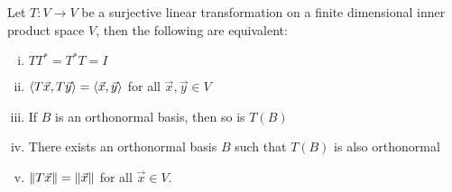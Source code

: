 \begin{theorem}
  Let $T : V \to V$ be a surjective linear transformation on a finite dimensional inner product space $V$, then the following are equivalent:
  \begin{enumerate}[i.]
    \item $T T^* = T^* T = I$
    \item $\left\langle T \vec x , T \vec y \right\rangle = \left\langle \vec x , \vec y \right\rangle$ for all $\vec x, \vec y \in V$
    \item If $B$ is an orthonormal basis, then so is $T(B)$
    \item There exists an orthonormal basis $B$ such that $T(B)$ is also orthonormal
    \item $\left\lVert T \vec x\right\rVert = \left\lVert\vec x\right\rVert$ for all $\vec x \in V$.
  \end{enumerate}
\end{theorem}
